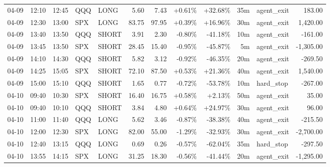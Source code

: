 \documentclass[11pt,a4paper,twoside]{article}
\begin{document}
\begin{center}
\begin{longtable}{>{\color{txtmain}}l l l l l r r r r r >{\color{txtmain}}l r}
04-09 & 12:10 & 12:45 & QQQ & LONG & 5.60 & 7.43 & \textcolor{wingreen}{+0.61\%} & \textcolor{wingreen}{+32.68\%} & 35m & agent\_exit & \textcolor{wingreen}{183.00} \\
04-09 & 12:30 & 13:00 & SPX & LONG & 83.75 & 97.95 & \textcolor{wingreen}{+0.39\%} & \textcolor{wingreen}{+16.96\%} & 30m & agent\_exit & \textcolor{wingreen}{1,420.00} \\
04-09 & 13:40 & 13:50 & QQQ & SHORT & 3.91 & 2.30 & \textcolor{lossred}{-0.80\%} & \textcolor{lossred}{-41.18\%} & 10m & agent\_exit & \textcolor{lossred}{-161.00} \\
04-09 & 13:45 & 13:50 & SPX & SHORT & 28.45 & 15.40 & \textcolor{lossred}{-0.95\%} & \textcolor{lossred}{-45.87\%} & 5m & agent\_exit & \textcolor{lossred}{-1,305.00} \\
04-09 & 14:10 & 14:30 & QQQ & SHORT & 5.82 & 3.12 & \textcolor{lossred}{-0.92\%} & \textcolor{lossred}{-46.35\%} & 20m & agent\_exit & \textcolor{lossred}{-269.50} \\
04-09 & 14:25 & 15:05 & SPX & SHORT & 72.10 & 87.50 & \textcolor{wingreen}{+0.53\%} & \textcolor{wingreen}{+21.36\%} & 40m & agent\_exit & \textcolor{wingreen}{1,540.00} \\
04-09 & 15:00 & 15:10 & QQQ & SHORT & 1.65 & 0.77 & \textcolor{lossred}{-0.72\%} & \textcolor{lossred}{-53.78\%} & 10m & hard\_stop & \textcolor{lossred}{-267.00} \\
04-10 & 09:40 & 10:30 & SPX & SHORT & 16.40 & 16.75 & \textcolor{wingreen}{+0.58\%} & \textcolor{wingreen}{+2.13\%} & 50m & agent\_exit & \textcolor{wingreen}{35.00} \\
04-10 & 09:40 & 10:10 & QQQ & SHORT & 3.84 & 4.80 & \textcolor{wingreen}{+0.64\%} & \textcolor{wingreen}{+24.97\%} & 30m & agent\_exit & \textcolor{wingreen}{96.00} \\
04-10 & 11:00 & 11:40 & QQQ & LONG & 5.62 & 3.46 & \textcolor{lossred}{-0.87\%} & \textcolor{lossred}{-38.38\%} & 40m & agent\_exit & \textcolor{lossred}{-215.50} \\
04-10 & 12:00 & 12:30 & SPX & LONG & 82.00 & 55.00 & \textcolor{lossred}{-1.29\%} & \textcolor{lossred}{-32.93\%} & 30m & agent\_exit & \textcolor{lossred}{-2,700.00} \\
04-10 & 12:40 & 13:15 & QQQ & LONG & 0.69 & 0.26 & \textcolor{lossred}{-0.57\%} & \textcolor{lossred}{-62.04\%} & 35m & hard\_stop & \textcolor{lossred}{-297.50} \\
04-10 & 13:55 & 14:15 & SPX & LONG & 31.25 & 18.30 & \textcolor{lossred}{-0.56\%} & \textcolor{lossred}{-41.44\%} & 20m & agent\_exit & \textcolor{lossred}{-1,295.00} \\

\end{longtable}
\end{center}
\end{document}
